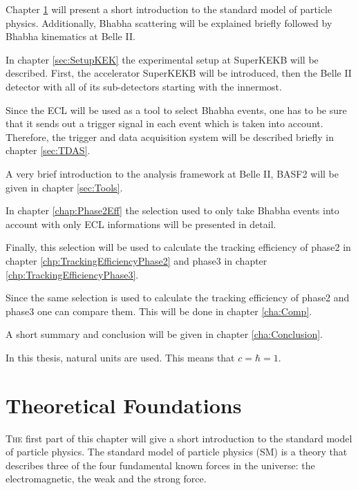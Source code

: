 \documentclass[a4paper,11pt,twosided,final,german,openbib,pdftex,listof=totoc,bibliography=totoc]{scrbook}
\begin{document}


Chapter \ref{cha:SM} will present a short introduction to the standard model of particle physics. Additionally, Bhabha scattering will be explained briefly followed by Bhabha kinematics at Belle II. 

In chapter \ref{sec:SetupKEK} the experimental setup at SuperKEKB will be described. First, the accelerator SuperKEKB will be introduced, then the Belle II detector with all of its sub-detectors starting with the innermost.

Since the ECL will be used as a tool to select Bhabha events, one has to be sure that it sends out a trigger signal in each event which is taken into account. Therefore, the trigger and data acquisition system will be described briefly in chapter \ref{sec:TDAS}.  

A very brief introduction to the analysis framework at Belle II, BASF2 will be given in chapter \ref{sec:Tools}.

In chapter \ref{chap:Phase2Eff} the selection used to only take Bhabha events into account with only ECL informations will be presented in detail. 

Finally, this selection will be used to calculate the tracking efficiency of phase2 in chapter \ref{chp:TrackingEfficiencyPhase2} and phase3 in chapter \ref{chp:TrackingEfficiencyPhase3}.

Since the same selection is used to calculate the tracking efficiency of phase2 and phase3 one can compare them. This will be done in chapter \ref{cha:Comp}.

A short summary and conclusion will be given in chapter \ref{cha:Conclusion}.
\newline 

In this thesis, natural units are used. This means that $c = \hbar = 1$.
\newline


\chapter{Theoretical Foundations}
\label{cha:SM}

\lettrine{T}{he} first part of this chapter will give  a short introduction to the standard model of particle physics. The standard model of particle physics (SM) is a theory that describes three of the four fundamental known forces in the universe: the electromagnetic, the weak and the strong force. 
\end{document}
